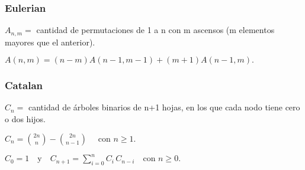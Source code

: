 {{{
} 
\subsubsection{Eulerian}
{
\( {\displaystyle A_{n, m}=} \) cantidad de permutaciones de 1 a n con m ascensos (m elementos mayores que el anterior).

\( {\displaystyle A(n,m)=(n-m)A(n-1,m-1)+(m+1)A(n-1,m).} \)
}
\subsubsection{Catalan}
{
\( {\displaystyle C_{n}=} \) cantidad de árboles binarios de n+1 hojas, en los que cada nodo tiene cero o dos hijos.

\({\displaystyle C_{n}={2n \choose n}-{2n \choose n-1}\quad {\mbox{ con }}n\geq 1.} \)

\( {\displaystyle C_{0}=1\quad {\mbox{y}}\quad C_{n+1}=\sum _{i=0}^{n}C_{i}\,C_{n-i}\quad {\mbox{con }}n\geq 0.} \)
}

}

%
%
%
%
%
%
%
%
%
%
%
%
%

}
